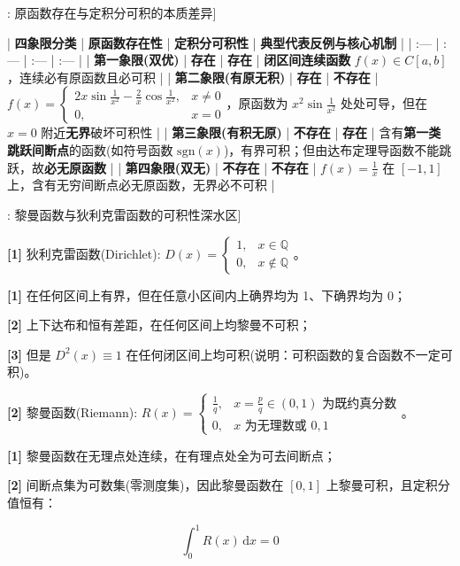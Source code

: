 \documentclass[11pt,a4paper,UTF8]{ctexart}
\begin{document}
\begin{thmbox}[原理[1]: 原函数存在与定积分可积的本质差异]

| \textbf{四象限分类} | \textbf{原函数存在性} | \textbf{定积分可积性} | \textbf{典型代表反例与核心机制} |
| :--- | :--- | :--- | :--- |
| \textbf{第一象限(双优)} | \textbf{存在} | \textbf{存在} | \textbf{闭区间连续函数} $f(x) \in C[a, b]$，连续必有原函数且必可积 |
| \textbf{第二象限(有原无积)} | \textbf{存在} | \textbf{不存在} | $f(x) = \begin{cases} 2x\sin\frac{1}{x^2} - \frac{2}{x}\cos\frac{1}{x^2}, & x \neq 0 \\ 0, & x = 0 \end{cases}$，原函数为 $x^2\sin\frac{1}{x^2}$ 处处可导，但在 $x=0$ 附近\textbf{无界}破坏可积性 |
| \textbf{第三象限(有积无原)} | \textbf{不存在} | \textbf{存在} | 含有\textbf{第一类跳跃间断点}的函数(如符号函数 $\text{sgn}(x)$)，有界可积；但由达布定理导函数不能跳跃，故\textbf{必无原函数} |
| \textbf{第四象限(双无)} | \textbf{不存在} | \textbf{不存在} | $f(x) = \frac{1}{x}$ 在 $[-1, 1]$ 上，含有无穷间断点必无原函数，无界必不可积 |

\end{thmbox}
\begin{thmbox}[原理[2]: 黎曼函数与狄利克雷函数的可积性深水区]

\textbf{[1]} 狄利克雷函数(Dirichlet): $D(x) = \begin{cases} 1, & x \in \mathbb{Q} \\ 0, & x \notin \mathbb{Q} \end{cases}$。

\textbf{[1]} 在任何区间上有界，但在任意小区间内上确界均为 1、下确界均为 0；

\textbf{[2]} 上下达布和恒有差距，在任何区间上均黎曼不可积；

\textbf{[3]} 但是 $D^2(x) \equiv 1$ 在任何闭区间上均可积(说明：可积函数的复合函数不一定可积)。

\textbf{[2]} 黎曼函数(Riemann): $R(x) = \begin{cases} \frac{1}{q}, & x = \frac{p}{q} \in (0, 1) \text{ 为既约真分数} \\ 0, & x \text{ 为无理数或 } 0, 1 \end{cases}$。

\textbf{[1]} 黎曼函数在无理点处连续，在有理点处全为可去间断点；

\textbf{[2]} 间断点集为可数集(零测度集)，因此黎曼函数在 $[0, 1]$ 上黎曼可积，且定积分值恒有：


\begin{equation*}
\int_0^1 R(x)\,\mathrm{d}x = 0
\end{equation*}


\end{thmbox}
\end{document}
